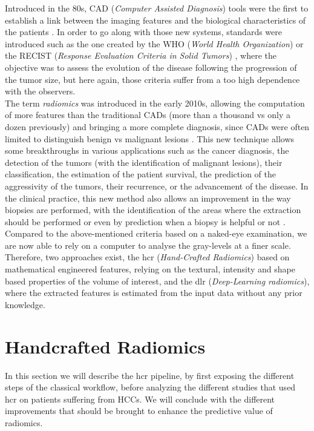 Introduced in the 80s, CAD (\emph{Computer Assisted Diagnosis}) tools
were the first to establish a link between the
imaging features and the biological characteristics of the patients
\cite{Doi2007}. In order to go along with those new systems, standards were introduced
such as the one created by the WHO (\emph{World Health Organization}) 
or the RECIST (\emph{Response Evaluation Criteria in Solid Tumors})
\cite{Jaffe2006}, where the objective was to assess the
evolution of the disease following the progression of the tumor size,
but here again, those criteria suffer from a too high dependence with
the observers.\\
The term \emph{radiomics} was introduced in the early 2010s, allowing
the computation of more features than the traditional CADs (more
than a thousand vs only a dozen previously) and bringing a more complete
diagnosis, since CADs were often limited to distinguish benign vs
malignant lesions \cite{Afshar2018}.
This new technique allows some breakthroughs in various applications
such as the cancer diagnosis, the detection of the tumors (with the
identification of malignant lesions), their classification, the
estimation of the patient survival, the prediction of the aggressivity
of the tumors, their recurrence, or the advancement of the disease.
In the clinical practice, this new method also allows an improvement in
the way biopsies are performed, with the identification of the areas
where the extraction should be performed \cite{Gillies2016}
or even by prediction when a biopsy is helpful or not \cite{Liu2016}.\\
Compared to the above-mentioned criteria based on a naked-eye examination,
we are now able to rely on a computer to analyse the gray-levels at a
finer scale. Therefore, two approaches exist, the \ac{hcr} (\emph{Hand-Crafted
Radiomics}) based on mathematical engineered features, relying on the
textural, intensity and shape based properties of the volume of interest, and
the \ac{dlr} (\emph{Deep-Learning radiomics}), where the extracted features
is estimated from the input data without any prior
knowledge.

\section{Handcrafted Radiomics }\label{handcrafted-radiomics}

In this section we will describe the \ac{hcr} pipeline, by first
exposing the different steps of the classical workflow, before analyzing
the different studies that used \ac{hcr} on patients suffering from
HCCs. We will conclude with the different improvements that
should be brought to enhance the predictive value of radiomics.

